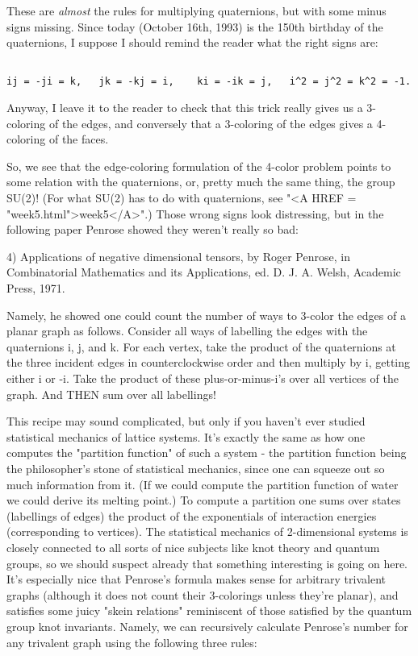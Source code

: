 These are \emph{almost} the rules for multiplying quaternions, but with some
minus signs missing.  Since today (October 16th, 1993) is the 150th
birthday of the quaternions, I suppose I should remind the reader what
the right signs are:


\begin{verbatim}

ij = -ji = k,	jk = -kj = i,    ki = -ik = j,   i^2 = j^2 = k^2 = -1.
\end{verbatim}
    

Anyway, I leave it to the reader to check that this
trick really gives us a 3-coloring of the edges, and conversely that a
3-coloring of the edges gives a 4-coloring of the faces.

So, we see that the edge-coloring formulation of the 4-color problem
points to some relation with the quaternions, or, pretty much the same
thing, the group SU(2)!  (For what SU(2) has to do with quaternions, see
"<A HREF = "week5.html">week5</A>".)  Those wrong signs look distressing, but in the following
paper Penrose showed they weren't really so bad:

4) Applications of negative dimensional tensors, by Roger Penrose, in
Combinatorial Mathematics and its Applications, ed. D. J. A. Welsh,
Academic Press, 1971.

Namely, he showed one could count the number of ways to 3-color the
edges of a planar graph as follows.  Consider all ways of labelling the
edges with the quaternions i, j, and k.  For each vertex, take the
product of the quaternions at the three incident edges in
counterclockwise order and then multiply by i, getting either i or -i.
Take the product of these plus-or-minus-i's over all vertices of the
graph.  And THEN sum over all labellings!

This recipe may sound complicated, but only if you haven't ever studied
statistical mechanics of lattice systems.  It's exactly the same as how
one computes the "partition function" of such a system - the partition
function being the philosopher's stone of statistical mechanics, since
one can squeeze out so much information from it.  (If we could compute
the partition function of water we could derive its melting point.)   To
compute a partition one sums over states (labellings of edges) the
product of the exponentials of interaction energies (corresponding to
vertices).  The statistical mechanics of 2-dimensional systems is
closely connected to all sorts of nice subjects like knot theory and
quantum groups, so we should suspect already that something
interesting is going on here.  It's especially nice that Penrose's
formula makes sense for arbitrary trivalent graphs (although it does not
count their 3-colorings unless they're planar), and satisfies some juicy
"skein relations" reminiscent of those satisfied by the quantum group
knot invariants.  Namely, we can recursively calculate Penrose's 
number for any trivalent graph using the following three rules:

